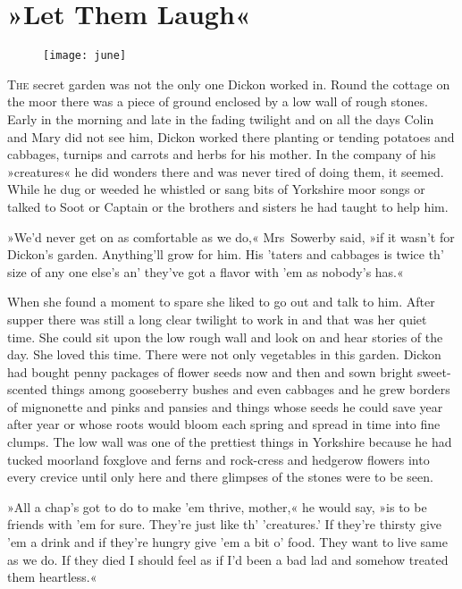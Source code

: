 \chapter{»Let Them Laugh«} 

\begin{figure}[t!]
\centering
\texttt{[image: june]}
\end{figure}

 \lettrine[lines=6]{T}{he} secret garden was not the only one Dickon worked in. Round the cottage on the moor there was a piece of ground enclosed by a low wall of rough stones. Early in the morning and late in the fading twilight and on all the days Colin and Mary did not see him, Dickon worked there planting or tending potatoes and cabbages, turnips and carrots and herbs for his mother. In the company of his »creatures« he did wonders there and was never tired of doing them, it seemed. While he dug or weeded he whistled or sang bits of Yorkshire moor songs or talked to Soot or Captain or the brothers and sisters he had taught to help him.

»We'd never get on as comfortable as we do,« Mrs~Sowerby said, »if it wasn't for Dickon's garden. Anything'll grow for him. His 'taters and cabbages is twice th' size of any one else's an' they've got a flavor with 'em as nobody's has.«

When she found a moment to spare she liked to go out and talk to him. After supper there was still a long clear twilight to work in and that was her quiet time. She could sit upon the low rough wall and look on and hear stories of the day. She loved this time. There were not only vegetables in this garden. Dickon had bought penny packages of flower seeds now and then and sown bright sweet-scented things among gooseberry bushes and even cabbages and he grew borders of mignonette and pinks and pansies and things whose seeds he could save year after year or whose roots would bloom each spring and spread in time into fine clumps. The low wall was one of the prettiest things in Yorkshire because he had tucked moorland foxglove and ferns and rock-cress and hedgerow flowers into every crevice until only here and there glimpses of the stones were to be seen.

»All a chap's got to do to make 'em thrive, mother,« he would say, »is to be friends with 'em for sure. They're just like th' 'creatures.' If they're thirsty give 'em a drink and if they're hungry give 'em a bit o' food. They want to live same as we do. If they died I should feel as if I'd been a bad lad and somehow treated them heartless.«

